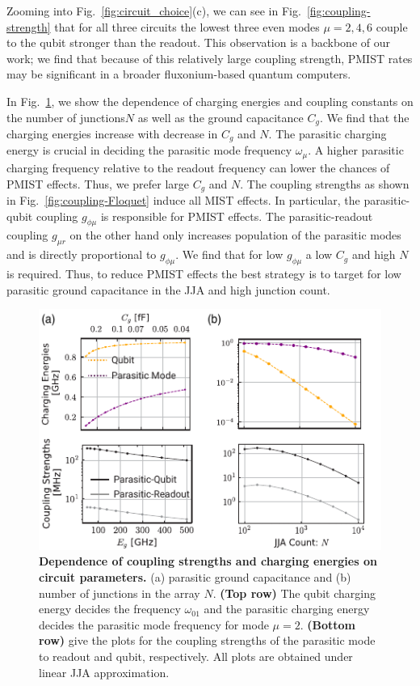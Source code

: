 \documentclass[%
reprint,
superscriptaddress,
 amsmath,amssymb,
 aps,
 prx,
longbibliography,
floatfix,
]{revtex4-2}
\begin{document}
Zooming into Fig.~\ref{fig:circuit_choice}(c), we can see in Fig.~\ref{fig:coupling-strength} that for all three circuits the lowest three even modes $\mu=2,4,6$ couple to the qubit stronger than the readout. This observation is a backbone of our work; we find that because of this relatively large coupling strength, PMIST rates may be significant in a broader fluxonium-based quantum computers.

In Fig.~\ref{fig:circuit_comp}, we show the dependence of charging energies and coupling constants on the number of junctions$N$ as well as the ground capacitance $C_g$. We find that the charging energies increase with decrease in $C_g$ and $N$. The parasitic charging energy is crucial in deciding the parasitic mode frequency $\omega_{\mu}$. A higher parasitic charging frequency relative to the readout frequency can lower the chances of PMIST effects. Thus, we prefer large $C_g$ and $N$. The coupling strengths as shown in Fig.~\ref{fig:coupling-Floquet} induce all MIST effects. In particular, the parasitic-qubit coupling $g_{\phi\mu}$ is responsible for PMIST effects. The parasitic-readout coupling $g_{\mu r}$ on the other hand only increases population  of the parasitic modes and is directly proportional to $g_{\phi\mu}$. We find that for low $g_{\phi\mu}$ a low $C_g$ and high $N$ is required. Thus, to reduce PMIST effects the best strategy is to target for low parasitic ground capacitance in the JJA and high junction count.
\begin{figure}[t]
    \centering
    \includegraphics[width=\linewidth]{Supp_Fig/Circuit_comp.pdf}
    \caption{{\bf Dependence of coupling strengths and charging energies on circuit parameters.} (a) parasitic ground capacitance and (b) number of junctions in the array $N$. {\bf (Top row)} The qubit charging energy decides the frequency $\omega_{01}$ and the parasitic charging energy decides the parasitic mode frequency for mode $\mu=2$. {\bf (Bottom row)} give the plots for the coupling strengths of the parasitic mode to readout and qubit, respectively. All plots are obtained under linear JJA approximation.}
    \label{fig:circuit_comp}
\end{figure}
\end{document}
